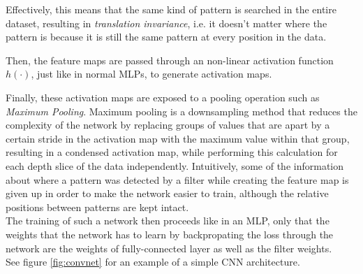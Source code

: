 Effectively, this means that the same kind of pattern is searched in the entire dataset, resulting in \textit{translation invariance}, i.e. it doesn't matter where the pattern is because it is still the same pattern at every position in the data.

Then, the feature maps are passed through an non-linear activation function $h(\cdot)$, just like in normal MLPs, to generate activation maps.

\noindent Finally, these activation maps are exposed to a pooling operation such as \textit{Maximum Pooling}. Maximum pooling is a downsampling method that reduces the complexity of the network by replacing groups of values that are apart by a certain stride in the activation map with the maximum value within that group, resulting in a condensed activation map, while performing this calculation for each depth slice of the data independently. Intuitively, some of the information about where a pattern was detected by a filter while creating the feature map is given up in order to make the network easier to train, although the relative positions between patterns are kept intact. \cite[pp. 330-345]{deeplearning_book}\\

\noindent The training of such a network then proceeds like in an MLP, only that the weights that the network has to learn by backpropating the loss through the network are the weights of fully-connected layer as well as the filter weights.\\

\noindent See figure \ref{fig:convnet} for an example of a simple CNN architecture.

